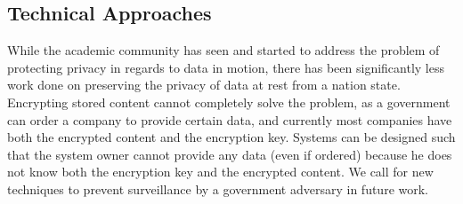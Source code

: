 
\subsection{Technical Approaches}
\label{sec:tech_rest}
While the academic community has seen and started to address the problem of protecting privacy in regards to data in motion, there has been significantly less work done on preserving the privacy of data at rest from a nation state.  Encrypting stored content cannot completely solve the problem, as a government can order a company to provide certain data, and currently most companies have both the encrypted content and the encryption key.  Systems can be designed such that the system owner cannot provide any data (even if ordered) because he does not know both the encryption key and the encrypted content.  We call for new techniques to prevent surveillance by a government adversary in future work.



